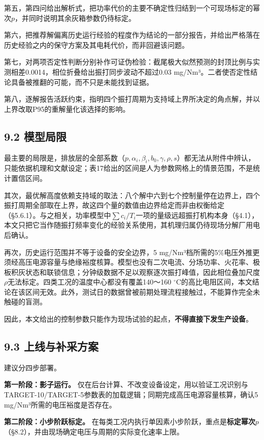 \documentclass[UTF8,zihao=5,a4paper]{ctexart}
\begin{document}
第五，第四问给出解析式，把功率代价的主要不确定性归结到一个可现场标定的幂次$p$，并同时说明其余灰箱参数仍待标定。

第六，把推荐解偏离历史运行经验的程度作为结论的一部分报告，并给出严格落在历史经验之内的保守方案及其电耗代价，而非回避该问题。

第七，对两项否定性判断分别补作可证伪检验：截尾极大似然预测的封顶比例与实测相差0.0014，相位折叠给出振打同步波动不超过0.03 mg/Nm³。二者使否定性结论具备被推翻的可能，而不只是未能找到证据。

第八，逐解报告活跃约束，指明四个振打周期为支持域上界所决定的角点解，并以上界改取P95的重解量化该选择的影响。

\subsection*{9.2 模型局限}

最主要的局限是，排放层的全部系数（$p,\alpha_i,\beta_i,b_0,\gamma,\rho,s$）都无法从附件中辨认，只能依据机理和文献设定；表17给出的区间是人为参数网格上的情景范围，不是统计置信区间。

其次，最优解高度依赖支持域的取法：八个解中六到七个控制量停在边界上，四个振打周期全部取在上界，故这四个量的数值由边界给定而非由权衡给定（§5.6.1）。与之相关，功率模型中$\sum c_i/T_i$一项的量级远超振打机构本身（§4.1），本文只把它当作随振打频率变化的经验关系使用，其机理归属仍待现场分解厂用电后确认。

再次，历史运行范围并不等于设备的安全边界，5 mg/Nm³档所需的5\%电压外推更须经高压电源容量与绝缘裕度核算。模型也没有二次电流、分场功率、火花率、极板积灰状态和联锁信息；分钟级数据不足以观察逐次振打峰值，因此相位叠加尺度$\rho$无法标定。四类工况的温度中心都没有覆盖140～160 $^\circ$C的高比电阻区间，本文结论在该区间无效。此外，测试日的数据曾被前期处理流程接触过，不能算作完全未触碰的盲测。

因此，本文给出的控制参数只能作为现场试验的起点，\textbf{不得直接下发生产设备}。

\subsection*{9.3 上线与补采方案}

建议分四步部署。

\textbf{第一阶段：影子运行。} 仅在后台计算、不改变设备设定，用以验证工况识别与TARGET-10/TARGET-5参数表的加载逻辑；同期完成高压电源容量核算，确认5 mg/Nm³所需的电压裕度是否存在。

\textbf{第二阶段：小步阶跃标定。} 在每类工况内执行单因素小步阶跃，重点是\textbf{标定幂次$p$}（§8.2），并由现场确定电压与周期的实际变化速率上限。
\end{document}
